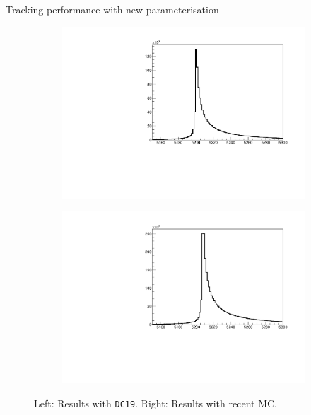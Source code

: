 \documentclass[xcolor={dvipsnames}]{beamer}
\begin{document}
\begin{frame}{Tracking performance with new parameterisation}
\begin{figure}[htb]
\begin{subfigure}{0.4\textwidth}
      \includegraphics[width=1\textwidth]{Plots/z_mag_distribution_old_parameterisation.pdf}
    \end{subfigure}%
    \begin{subfigure}{0.4\textwidth}
      \includegraphics[width=1\textwidth]{Plots/z_mag_distribution_new_parameterisation.pdf}
    \end{subfigure}
    \vspace{-0.3cm}
    \caption*{Left: Results with \texttt{DC19}. Right: Results with recent MC.}
  \end{figure}
\end{frame}
\end{document}
